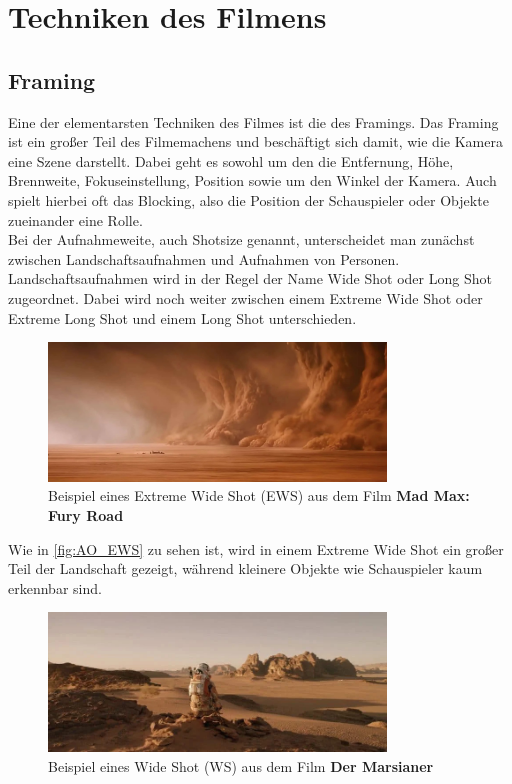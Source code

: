 \section{Techniken des Filmens}
\subsection{Framing}
Eine der elementarsten Techniken des Filmes ist die des Framings. Das Framing ist ein großer Teil des Filmemachens und beschäftigt sich damit, wie die Kamera eine Szene darstellt. Dabei geht es sowohl um den die Entfernung, Höhe, Brennweite, Fokuseinstellung, Position sowie um den Winkel der Kamera. Auch spielt hierbei oft das Blocking, also die Position der Schauspieler oder Objekte zueinander eine Rolle.\\
Bei der Aufnahmeweite, auch Shotsize genannt, unterscheidet man zunächst zwischen Landschaftsaufnahmen und Aufnahmen von Personen. Landschaftsaufnahmen wird in der Regel der Name Wide Shot oder Long Shot zugeordnet. Dabei wird noch weiter zwischen einem Extreme Wide Shot oder Extreme Long Shot und einem Long Shot unterschieden.

\begin{figure}[h]
    \centering
    \includegraphics[width=0.8\textwidth]{img/AO_ELS.jpg}
    \caption[Imagefilm: Extreme Wide Shot]{Beispiel eines Extreme Wide Shot (EWS) aus dem Film \textbf{Mad Max: Fury Road}}
    \label{fig:AO_EWS}
\end{figure}

Wie in \autoref{fig:AO_EWS} zu sehen ist, wird in einem Extreme Wide Shot ein großer Teil der Landschaft gezeigt, während kleinere Objekte wie Schauspieler kaum erkennbar sind.\autocite{Studiobinder.2020}

\begin{figure}[h]
    \centering
    \includegraphics[width=0.8\textwidth]{img/AO_WS.jpg}
    \caption[Imagefilm: Wide Shot]{Beispiel eines Wide Shot (WS) aus dem Film \textbf{Der Marsianer}}
    \label{fig:AO_WS}
\end{figure}


